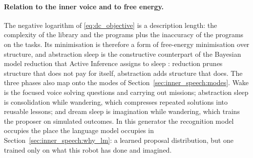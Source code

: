 \paragraph{Relation to the inner voice and to free energy.}
The negative logarithm of \eqref{eq:dc_objective} is a description length: the complexity of the library and the
programs plus the inaccuracy of the programs on the tasks. Its minimisation is therefore a form of free-energy
minimisation over structure, and abstraction sleep is the constructive counterpart of the Bayesian model reduction
that Active Inference assigns to sleep \cite{friston2017curiosity}: reduction prunes structure that does not pay for
itself, abstraction adds structure that does. The three phases also map onto the modes of
Section~\ref{sec:inner_speech:modes}. Wake is the focused voice solving questions and carrying out missions;
abstraction sleep is consolidation while wandering, which compresses repeated solutions into reusable lessons; and
dream sleep is imagination while wandering, which trains the proposer on simulated outcomes. In this generator the
recognition model occupies the place the language model occupies in Section~\ref{sec:inner_speech:why_lm}: a
learned proposal distribution, but one trained only on what this robot has done and imagined.

